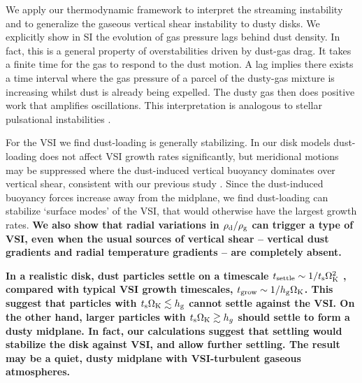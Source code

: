 

We  apply our thermodynamic framework to interpret
the streaming instability \citep[SI, ][]{youdin05a,jacquet11} and to generalize the gaseous vertical shear
instability \citep[VSI, ][]{nelson13,lin15} to dusty disks. We 
explicitly show in SI the evolution of gas 
pressure lags behind dust density. In fact, this is a general property of 
overstabilities driven by dust-gas drag. 
It takes a finite time for the gas to respond to
the dust motion. A lag implies there exists a time interval where 
the gas pressure of a parcel of the dusty-gas mixture is increasing whilst dust is already being expelled.  
The dusty gas then does positive work that amplifies 
oscillations. This interpretation is analogous to stellar pulsational
instabilities \citep{cox67}. 

For the VSI we find dust-loading is generally stabilizing. In our disk models 
dust-loading does not affect VSI growth rates significantly, but
meridional motions may be suppressed where the dust-induced
vertical buoyancy dominates over vertical shear, consistent with our
previous study \citep{lin15}. 
Since the dust-induced buoyancy forces
increase away from the midplane, we find dust-loading can stabilize
`surface modes'  of the VSI, that would otherwise have the largest
growth rates. {\bf We also show that radial variations in
  $\rho_\mathrm{d}/\rho_\mathrm{g}$ can trigger a type of VSI, even when the 
  usual sources of vertical shear -- vertical dust gradients and radial 
  temperature gradients -- are completely absent.  
}  

{\bf In a realistic disk, dust particles settle on a timescale $
  t_\mathrm{settle} \sim 1/t_\mathrm{s}\Omega_{\rm K}^2$ \citep{takeuchi02}, compared 
  with typical VSI growth timescales, $t_\mathrm{grow}\sim 
  1/h_\mathrm{g}\Omega_{\rm K}$. This suggest that particles with $t_\mathrm{s}\Omega_{\rm K}\lesssim 
  h_\mathrm{g}$ cannot settle against the VSI. On the 
  other hand, larger particles with $t_\mathrm{s}\Omega_{\rm K}\gtrsim h_g$ should
  settle to form a dusty midplane. In fact, our calculations suggest that
  settling would stabilize the disk against VSI, and allow
  further settling. The result may be a quiet, dusty midplane \citep[unless non-axisymmetric
  instabilities develop, ][]{chiang08} with VSI-turbulent gaseous
  atmospheres. 
}


